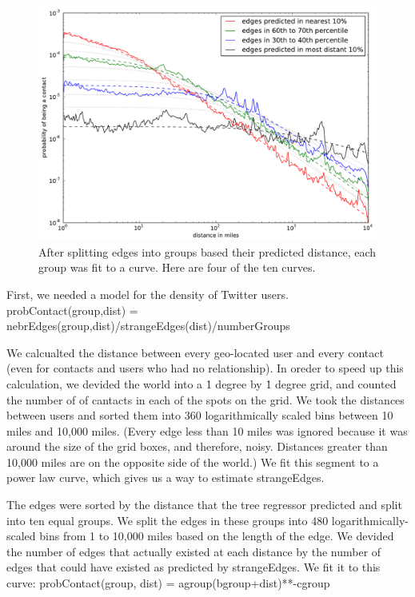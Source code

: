 \begin{figure}[tb]
\centering
\includegraphics[width=\linewidth]{figures/near_prob_fit.pdf}
\caption{
After splitting edges into groups based their predicted distance, each group was fit to a curve. Here are four of the ten curves.
}
\label{fig:NearProbFit}
\end{figure}

First, we needed a model for the density of Twitter users.
probContact(group,dist) = nebrEdges(group,dist)/strangeEdges(dist)/numberGroups

We calcualted the distance between every geo-located user and every contact
(even for contacts and users who had no relationship).
%
In oreder to speed up this calculation, we devided the world into a \.1 degree
by \.1 degree grid, and counted the number of of cantacts in each of the spots
on the grid.
%
We took the distances between users and sorted them into 360 logarithmically
scaled bins between 10 miles and 10,000 miles.
%
(Every edge less than 10 miles was ignored because it was around the size of
the grid boxes, and therefore, noisy. Distances greater than 10,000 miles are
on the opposite side of the world.)
%
We fit this segment to a power law curve, which gives us a way to estimate
strangeEdges.

The edges were sorted by the distance that the tree regressor predicted and
split into ten equal groups.
%
We split the edges in these groups into 480 logarithmically-scaled bins from 1
to 10,000 miles based on the length of the edge.
%
We devided the number of edges that actually existed at each distance by the
number of edges that could have existed as predicted by strangeEdges.
%
We fit it to this curve:
%
probContact(group, dist) = agroup(bgroup+dist)**-cgroup

